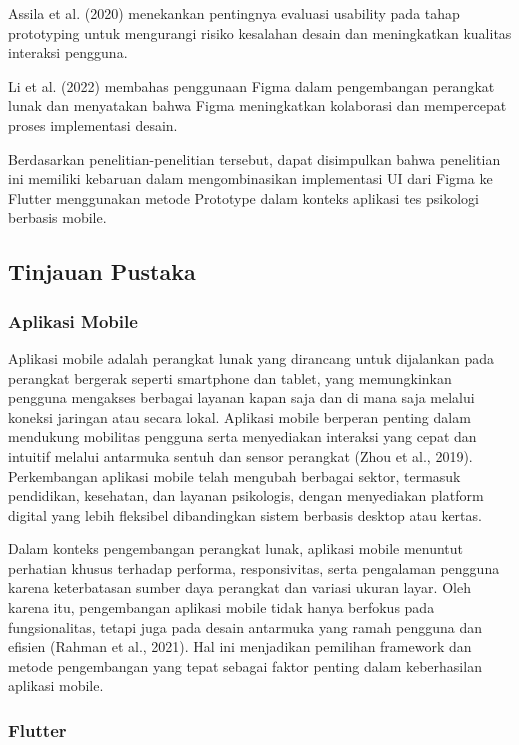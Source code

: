 Assila et al. (2020) menekankan pentingnya evaluasi usability pada tahap prototyping untuk mengurangi risiko kesalahan desain dan meningkatkan kualitas interaksi pengguna.

Li et al. (2022) membahas penggunaan Figma dalam pengembangan perangkat lunak dan menyatakan bahwa Figma meningkatkan kolaborasi dan mempercepat proses implementasi desain.

Berdasarkan penelitian-penelitian tersebut, dapat disimpulkan bahwa penelitian ini memiliki kebaruan dalam mengombinasikan implementasi UI dari Figma ke Flutter menggunakan metode Prototype dalam konteks aplikasi tes psikologi berbasis mobile.


\subsection{Tinjauan Pustaka}

\subsubsection{Aplikasi Mobile}

Aplikasi mobile adalah perangkat lunak yang dirancang untuk dijalankan pada perangkat bergerak seperti smartphone dan tablet, yang memungkinkan pengguna mengakses berbagai layanan kapan saja dan di mana saja melalui koneksi jaringan atau secara lokal. Aplikasi mobile berperan penting dalam mendukung mobilitas pengguna serta menyediakan interaksi yang cepat dan intuitif melalui antarmuka sentuh dan sensor perangkat (Zhou et al., 2019). Perkembangan aplikasi mobile telah mengubah berbagai sektor, termasuk pendidikan, kesehatan, dan layanan psikologis, dengan menyediakan platform digital yang lebih fleksibel dibandingkan sistem berbasis desktop atau kertas.

Dalam konteks pengembangan perangkat lunak, aplikasi mobile menuntut perhatian khusus terhadap performa, responsivitas, serta pengalaman pengguna karena keterbatasan sumber daya perangkat dan variasi ukuran layar. Oleh karena itu, pengembangan aplikasi mobile tidak hanya berfokus pada fungsionalitas, tetapi juga pada desain antarmuka yang ramah pengguna dan efisien (Rahman et al., 2021). Hal ini menjadikan pemilihan framework dan metode pengembangan yang tepat sebagai faktor penting dalam keberhasilan aplikasi mobile.


\subsubsection{Flutter}

